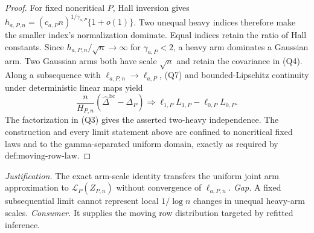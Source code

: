\documentclass{article}
\begin{document}
\begin{proof}
For fixed noncritical \(P\), Hall inversion gives
\(h_{a,P,n}=(c_{a,P}n)^{1/\gamma_{a,P}}\{1+o(1)\}\).  Two unequal heavy indices therefore make the smaller index's normalization dominate.  Equal indices retain the ratio of Hall constants.  Since \(h_{a,P,n}/\sqrt n\to\infty\) for \(\gamma_{a,P}<2\), a heavy arm dominates a Gaussian arm.  Two Gaussian arms both have scale \(\sqrt n\) and retain the covariance in (Q4).  Along a subsequence with \(\ell_{a,P,n}\to\ell_{a,P}\), (Q7) and bounded-Lipschitz continuity under deterministic linear maps yield
\[
\frac n{H_{P,n}}(\widehat\Delta^{\mathrm{bc}}-\Delta_P)
\Rightarrow\ell_{1,P}L_{1,P}-\ell_{0,P}L_{0,P}.
\]
The factorization in (Q3) gives the asserted two-heavy independence.  The construction and every limit statement above are confined to noncritical fixed laws and to the gamma-separated uniform domain, exactly as required by \(\text{def:moving-row-law}\).
\end{proof}
\par\smallskip\noindent \textit{Justification.} The exact arm-scale identity transfers the uniform joint arm approximation to \(\mathcal L_P(Z_{P,n})\) without convergence of \(\ell_{a,P,n}\). \textit{Gap.} A fixed subsequential limit cannot represent local \(1/\log n\) changes in unequal heavy-arm scales. \textit{Consumer.} It supplies the moving row distribution targeted by refitted inference.
\end{document}
